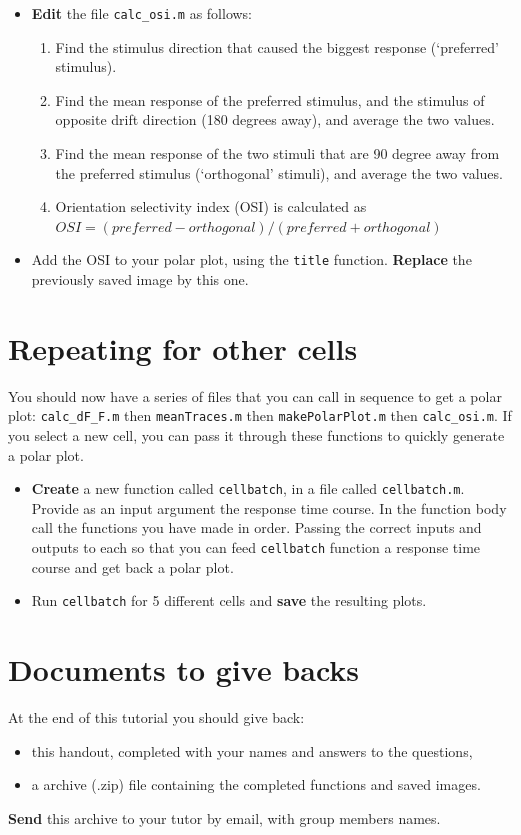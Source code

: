 \documentclass[paper=a4, fontsize=11pt]{article} %
\numberwithin{equation}{section} %
\numberwithin{figure}{section} %
\numberwithin{table}{section} %
\begin{document}
\begin{itemize}
\item \textbf{Edit} the file \texttt{calc\_osi.m} as follows:
  \begin{enumerate}
  \item Find the stimulus direction that caused the biggest response (`preferred' stimulus).
  \item Find the mean response of the preferred stimulus, and the stimulus of opposite drift direction (180 degrees away), and average the two values.
  \item Find the mean response of the two stimuli that are 90 degree away from the preferred stimulus (`orthogonal' stimuli), and average the two values.
  \item Orientation selectivity index (OSI) is calculated as \\ $OSI = {\left(preferred - orthogonal\right)} / {\left(preferred + orthogonal\right)}$
  \end{enumerate}
\item Add the OSI to your polar plot, using the \texttt{title} function.
  \textbf{Replace} the previously saved image by this one.
\end{itemize}


\section{Repeating for other cells}

You should now have a series of files that you can call in sequence to get a polar plot: \texttt{calc\_dF\_F.m} then \texttt{meanTraces.m} then \texttt{makePolarPlot.m} then \texttt{calc\_osi.m}. If you select a new cell, you can pass it through these functions to quickly generate a polar plot.

\begin{itemize}
\item \textbf{Create} a new function called \texttt{cellbatch}, in a file called \texttt{cellbatch.m}. Provide as an input argument the response time course. In the function body call the functions you have made in order. Passing the correct inputs and outputs to each so that you can feed \texttt{cellbatch} function a response time course and get back a polar plot.
\item Run \texttt{cellbatch} for 5 different cells and \textbf{save} the resulting plots.
\end{itemize}


\section*{Documents to give backs}

At the end of this tutorial you should give back:
\begin{itemize}
  \item this handout, completed with your names and answers to the questions,
  \item a archive (.zip) file containing the completed functions and saved images.
\end{itemize}
\textbf{Send} this archive to your tutor by email, with group members names.
\end{document}
